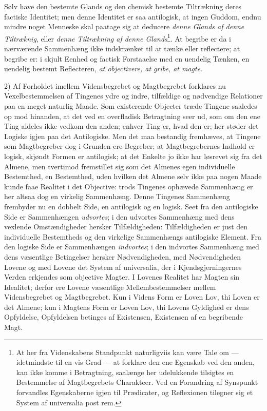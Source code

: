 \documentclass[12pt]{book}
\newcommand{\opage}[1]{\marginnote{\footnotesize\textit{[#1]}}}
\begin{document}
Sølv have den bestemte Glands og den chemisk bestemte Tiltrækning deres factiske Identitet; men
denne Identitet er saa antilogisk, at ingen Guddom, endnu mindre noget Menneske skal paatage sig at
deducere \emph{denne Glands af denne Tiltræknig}, eller \emph{denne Tiltrækning af denne
Glands}\footnote{At her fra Videnskabens Standpunkt naturligviis kan være Tale om ---
idetmindste til en vis Grad --- at forklare den ene Egenskab ved den anden, kan ikke komme i
Betragtning, saalænge her udelukkende tilsigtes en Bestemmelse af Magtbegrebets Charakteer. Ved en
Forandring af Synspunkt forvandles Egenskaberne igjen til Prædicater, og Reflexionen tilegner sig et
System af universalia post rem.}. At begribe er da i nærværende Sammenhæng ikke indskrænket til at
tænke eller reflectere; at begribe er: i skjult Eenhed og factisk Forstaaelse med en uendelig
Tænken, en uendelig bestemt Reflecteren, \emph{at objectivere, at gribe, at magte}.

2) Af Forholdet imellem Vidensbegrebet og Magtbegrebet forklares nu Vexelbestemmelsen af Tingenes
ydre og indre, tilfældige og nødvendige Relationer paa en meget naturlig Maade. Som existerende
Objecter træde Tingene saaledes op
\opage{205} mod hinanden, at det ved en overfladisk Betragtning seer ud, som om den ene Ting aldeles ikke vedkom
den anden; enhver Ting er, hvad den er; her støder det Logiske igjen paa det Antilogiske. Men det
maa bestandig fremhæves, at Tingene som Magtbegreber dog i Grunden ere Begreber; at Magtbegrebernes
Indhold er logisk, skjøndt Formen er antilogisk; at det Enkelte jo ikke har løsrevet sig fra det
Almene, men tvertimod fremstillet sig som det Almenes egen individuelle Bestemthed, en Bestemthed,
uden hvilken det Almene selv ikke paa nogen Maade kunde faae Realitet i det Objective: trods
Tingenes ophævede Sammenhæng er her altsaa dog en virkelig Sammenhæng. Denne Tingenes Sammenhæng
frembyder nu en dobbelt Side, en antilogisk og en logisk. Seet fra den antilogiske Side er
Sammenhængen \emph{udvortes}; i den udvortes Sammenhæng med dens vexlende Omstændigheder hersker
Tilfældigheden: Tilfældigheden er just den individuelle Bestemtheds og den virkelige Sammenhængs
antilogiske Element. Fra den logiske Side er Sammenhængen \emph{indvortes}; i den indvortes
Sammenhæng med dens væsentlige Betingelser hersker Nødvendigheden, med Nødvendigheden Lovene og med
Lovene det System af universalia, der i Kjendsgjerningernes Verden erkjendes som objective Magter.
I Lovenes Realitet har Magten sin Idealitet; derfor ere Lovene væsentlige Mellembestemmelser mellem
Vidensbegrebet og Magtbegrebet. Kun i Videns Form er Loven Lov, thi Loven er det Almene; kun i
Magtens Form er Loven Lov, thi Lovens Gyldighed er dens Opfyldelse, Opfyldelsen betinges af
Existensen, Existensen af en begribende Magt.
\end{document}
